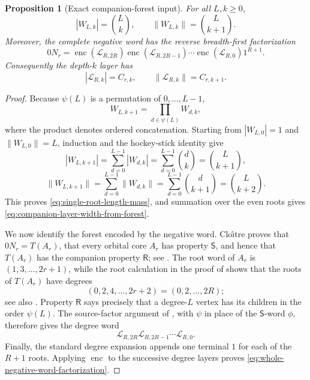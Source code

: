 \documentclass[11pt]{article}
\newtheorem{proposition}[theorem]{Proposition}
\theoremstyle{definition}
\theoremstyle{remark}
\begin{document}
\begin{proposition}[Exact companion-forest input]
\label{prop:companion-forest-encoding}
For all \(L,k\ge0\),
\begin{equation}
 |W_{L,k}|=\binom Lk,
 \qquad \|W_{L,k}\|=\binom L{k+1}.
 \label{eq:single-root-length-mass}
\end{equation}
Moreover, the complete negative word has the reverse breadth-first
factorization
\begin{equation}
 {
 0N_r=
 \operatorname{enc}(\mathcal L_{R,2R})
 \operatorname{enc}(\mathcal L_{R,2R-1})\cdots
 \operatorname{enc}(\mathcal L_{R,0})1^{R+1}.}
 \label{eq:whole-negative-word-factorization}
\end{equation}
Consequently the depth-\(k\) layer has
\begin{equation}
 |\mathcal L_{R,k}|=C_{r,k},
 \qquad
 \|\mathcal L_{R,k}\|=C_{r,k+1}.
 \label{eq:companion-layer-width-from-forest}
\end{equation}
\end{proposition}

\begin{proof}
Because \(\psi(L)\) is a permutation of \(0,\ldots,L-1\),
\[
 W_{L,k+1}=\prod_{d\in\psi(L)}W_{d,k},
\]
where the product denotes ordered concatenation.  Starting from
\(|W_{L,0}|=1\) and \(\|W_{L,0}\|=L\), induction and the hockey-stick
identity give
\[
 |W_{L,k+1}|=\sum_{d=0}^{L-1}|W_{d,k}|
 =\sum_{d=0}^{L-1}\binom dk=\binom L{k+1},
\]
\[
 \|W_{L,k+1}\|=\sum_{d=0}^{L-1}\|W_{d,k}\|
 =\sum_{d=0}^{L-1}\binom d{k+1}=\binom L{k+2}.
\]
This proves \eqref{eq:single-root-length-mass}, and summation over the even
roots gives \eqref{eq:companion-layer-width-from-forest}.

We now identify the forest encoded by the negative word.  Clo\^{\i}tre
proves that \(0N_r=T(A_r)\), that every orbital core \(A_r\) has property
\(\mathsf S\), and hence that \(T(A_r)\) has the companion property
\(\mathsf R\); see
\cite[Lem.~4.3, Cor.~4.6, Def.~4.4, and Lem.~4.5]{Cloitre2026}.
The root word of \(A_r\) is \((1,3,\ldots,2r+1)\), while the root
calculation in the proof of \cite[Lem.~4.11]{Cloitre2026} shows that the
roots of \(T(A_r)\) have degrees
\[
 (0,2,4,\ldots,2r+2)=(0,2,\ldots,2R);
\]
see also \cite[Sec.~8.3]{Cloitre2026}.  Property \(\mathsf R\) says
precisely that a degree-\(L\) vertex has its children in the order
\(\psi(L)\).  The source-factor argument of
\cite[Lem.~4.9]{Cloitre2026}, with \(\psi\) in place of the
\(\mathsf S\)-word \(\phi\), therefore gives the degree word
\[
 \mathcal L_{R,2R}\mathcal L_{R,2R-1}\cdots\mathcal L_{R,0}.
\]
Finally, the standard degree expansion appends one terminal \(1\) for
each of the \(R+1\) roots.  Applying \(\operatorname{enc}\) to the
successive degree layers proves
\eqref{eq:whole-negative-word-factorization}.
\end{proof}
\end{document}
